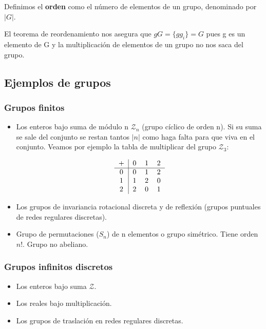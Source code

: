 \documentclass{article}
\begin{document}
\smallskip
Definimos el \textbf{orden} como el número de elementos de un grupo, denominado por $|G|$.

\smallskip
El teorema de reordenamiento nos asegura que $gG=\lbrace gg_i\rbrace =G$ pues g es un elemento de G y la multiplicación de elementos de un grupo no nos saca del grupo.

\subsection{Ejemplos de grupos}

\subsubsection{Grupos finitos}

\begin{itemize}
    \item Los enteros bajo suma de módulo n $\mathcal{Z}_n$ (grupo cíclico de orden n). Si su suma se sale del conjunto se restan tantos $|n|$ como haga falta para que viva en el conjunto. Veamos por ejemplo la tabla de multiplicar del grupo $\mathcal{Z}_3$:

    $$\begin{tabular}[b]{ c | c c c }

+ & 0 & 1 & 2 \\
\hline
0  & 0 & 1 & 2 \\

1 & 1 & 2 & 0 \\

2 & 2 & 0 & 1

\end{tabular}
$$

    \item Los grupos de invariancia rotacional discreta y de reflexión (grupos puntuales de redes regulares discretas).
    \item Grupo de permutaciones ($S_n$) de n elementos o grupo simétrico. Tiene orden $n!$. Grupo no abeliano.
\end{itemize}

\subsubsection{Grupos infinitos discretos}

\begin{itemize}
    \item Los enteros bajo suma $\mathcal{Z}$.
    \item Los reales bajo multiplicación.
    \item Los grupos de traslación en redes regulares discretas.
\end{itemize}
\end{document}
